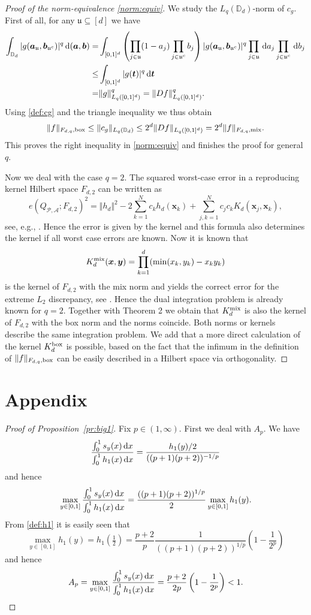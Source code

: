 \documentclass[12pt]{article}
\theoremstyle{remark}
\theoremstyle{definition}
\newcommand{\D}{\mathbb{D}}
\newcommand{\bx}{{\rm box}}
\newcommand{\mx}{{\rm mix}}
\newcommand{\rd}{\,{\rm d}}
\newcommand{\bsx}{{\boldsymbol x}}
\newcommand{\bsy}{{\boldsymbol y}}
\newcommand{\bst}{{\boldsymbol t}}
\newcommand{\bsa}{{\boldsymbol a}}
\newcommand{\bsb}{{\boldsymbol b}}
\newcommand{\uu}{\mathfrak{u}}
\newcommand{\cP}{\mathcal{P}}
\newcommand{\cA}{\mathcal{A}}
\newcommand{\<}{\langle}
\renewcommand{\>}{\rangle}
\begin{document}
\begin{appendix}
\begin{proof}[Proof of the norm-equivalence \eqref{norm:equiv}]
We study the $L_q(\D_d)$-norm of $c_g$. First of all, for any $\uu \subseteq [d]$ we have 
\begin{align*}
\int_{\D_d} | g(\bsa_{\uu},\bsb_{\uu^c})|^q \rd (\bsa,\bsb) =& \int_{[0,1]^d} \left(\prod_{j \in \uu}(1-a_j) \prod_{j \in \uu^c} b_j\right)  | g(\bsa_{\uu},\bsb_{\uu^c})|^q \prod_{j \in \uu} \rd a_j \prod_{j \in \uu^c} \rd b_j\\
\le &  \int_{[0,1]^d} | g(\bst)|^q \rd \bst\\
= & \|g\|_{L_q([0,1]^d)}^q = \|D f\|_{L_q([0,1]^d)}^q.
\end{align*}
Using \eqref{def:cg} and the triangle inequality we thus obtain 
\begin{equation*}\label{bd:norm:o}
\|f\|_{F_{d,q},\bx} \le \|c_g\|_{L_q(\D_d)} \le 2^d \|D f\|_{L_q([0,1]^d)} = 2^d \|f\|_{F_{d,q},\mx}.
\end{equation*}
This proves the right inequality in \eqref{norm:equiv} and finishes the proof for general $q$.

Now we deal with the case $q=2$. 
The squared worst-case error in a  reproducing kernel Hilbert space  $F_{d,2}$ can be written as 
\[
e(Q_{\cP,\cA};F_{d,2})^2 = \Vert h_d \Vert^2 - 2 \sum _{k=1}^N c_k h_d (  \bsx_k) + \sum_{j,k=1}^N c_j c_k K_d ( \bsx_j, \bsx_k ) ,
\]
see, e.g., \cite[Eq.~(9.31)]{NW10}. Hence the error is given by the kernel and this formula also determines  the kernel 
if all worst case errors are known. 
Now it is known that 
\[
K_d^\mx (\bsx, \bsy) = \prod_{k=1}^d ( \min (x_k, y_k) - x_k y_k) 
\]
is the kernel of $F_{d,2}$ with the mix norm and yields the correct error for the extreme $L_2$ discrepancy, see \cite[Eq.~(9.41)]{NW10}. 
Hence the dual integration problem is already known for $q=2$. 
Together with Theorem 2 we obtain that $K_d^{\mx}$ is also the kernel of $F_{d,2}$ with the box norm 
and the norms coincide. Both norms or kernels  
describe the same integration 
problem. 
We add that a more direct calculation of the kernel $K_d^{\bx} $ is possible, 
based on the fact that the infimum in the definition of 
$
\|f\|_{F_{d,q},\bx} 
$   
can be easily described in a Hilbert space via orthogonality. 
\end{proof}


\section{Appendix}\label{sec:appB}

\begin{proof}[Proof of Proposition~\ref{pr:big1}]
Fix $p \in (1,\infty)$. First we deal with $A_p$. We have 
$$\frac{\int_0^1 s_y(x)\rd x}{\int_0^1 h_1(x)\rd x}=\frac{h_1(y)/2}{((p+1)(p+2))^{-1/p}}$$ and hence
$$\max_{y \in [0,1]} \frac{\int_0^1 s_y(x)\rd x}{\int_0^1 h_1(x)\rd x}= \frac{((p+1)(p+2))^{1/p}}{2} \max_{y \in [0,1]} h_1(y).$$ 
From \eqref{def:h1} it is easily seen that $$\max_{y \in [0,1]} h_1(y)=h_1(\tfrac{1}{2})= \frac{p+2}{p} \frac{1}{((p+1)(p+2))^{1/p}} \left(1-\frac{1}{2^p}\right)$$ and hence $$A_p=\max_{y \in [0,1]} \frac{\int_0^1 s_y(x)\rd x}{\int_0^1 h_1(x)\rd x}=\frac{p+2}{2 p} \left(1-\frac{1}{2^p}\right) < 1.$$


\end{proof}
\end{appendix}
\end{document}
